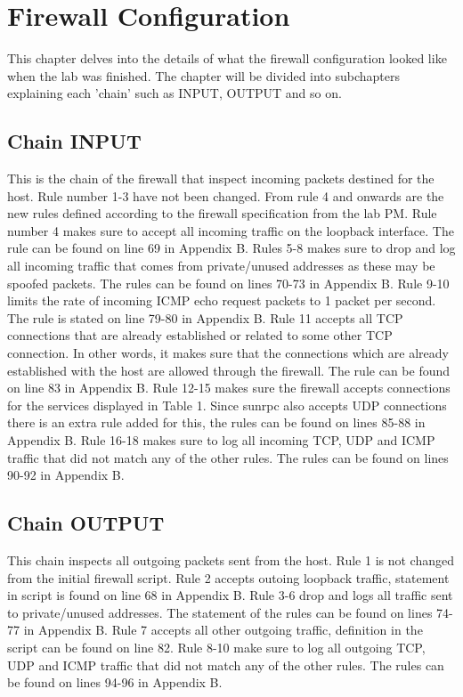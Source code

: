 \section{Firewall Configuration}
\label{sec:config}
This chapter delves into the details of what the firewall configuration looked like when the lab was finished. The chapter will be divided into subchapters explaining each 'chain' such as INPUT, OUTPUT and so on.

\subsection{Chain INPUT}
This is the chain of the firewall that inspect incoming packets destined for the host. Rule number 1-3 have not been changed. From rule 4 and onwards are the new rules defined according to the firewall specification from the lab PM. Rule number 4 makes sure to accept all incoming traffic on the loopback interface. The rule can be found on line 69 in Appendix B. Rules 5-8 makes sure to drop and log all incoming traffic that comes from private/unused addresses as these may be spoofed packets. The rules can be found on lines 70-73 in Appendix B. Rule 9-10 limits the rate of incoming ICMP echo request packets to 1 packet per second. The rule is stated on line 79-80 in Appendix B. Rule 11 accepts all TCP connections that are already established or related to some other TCP connection. In other words, it makes sure that the connections which are already established with the host are allowed through the firewall. The rule can be found on line 83 in Appendix B. Rule 12-15 makes sure the firewall accepts connections for the services displayed in Table 1. Since sunrpc also accepts UDP connections there is an extra rule added for this, the rules can be found on lines 85-88 in Appendix B. Rule 16-18 makes sure to log all incoming TCP, UDP and ICMP traffic that did not match any of the other rules. The rules can be found on lines 90-92 in Appendix B.

\subsection{Chain OUTPUT}
This chain inspects all outgoing packets sent from the host. Rule 1 is not changed from the initial firewall script. Rule 2 accepts outoing loopback traffic, statement in script is found on line 68 in Appendix B. Rule 3-6 drop and logs all traffic sent to private/unused addresses. The statement of the rules can be found on lines 74-77 in Appendix B. Rule 7 accepts all other outgoing traffic, definition in the script can be found on line 82. Rule 8-10 make sure to log all outgoing TCP, UDP and ICMP traffic that did not match any of the other rules. The rules can be found on lines 94-96 in Appendix B.

